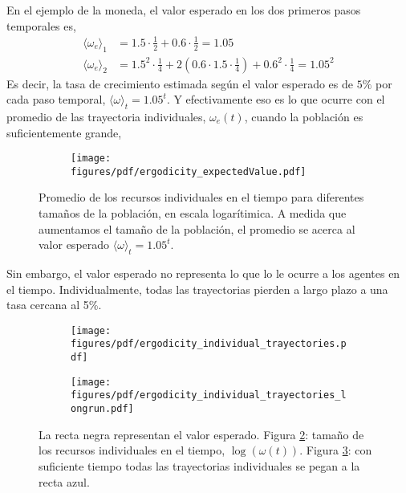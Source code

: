 \documentclass[a4paper,10pt]{article}
\begin{document}
En el ejemplo de la moneda, el valor esperado en los dos primeros pasos temporales es, 
%
\begin{equation}
\begin{split}
\langle \omega_e \rangle_1 & = 1.5 \cdot \frac{1}{2} + 0.6 \cdot  \frac{1}{2} = 1.05 \\ 
\langle \omega_e \rangle_2 &=  1.5^2 \cdot \frac{1}{4} + 2 (0.6 \cdot 1.5 \cdot \frac{1}{4} ) + 0.6^2 \cdot \frac{1}{4}= 1.05^2
\end{split}
\end{equation}
%
Es decir, la tasa de crecimiento estimada según el valor esperado es de $5\%$ por cada paso temporal, $\langle \omega \rangle_t = 1.05^t$.
Y efectivamente eso es lo que ocurre con el promedio de las trayectoria individuales, $\omega_e(t)$, cuando la población es suficientemente grande,
%
\begin{figure}[H]
    \centering
    \begin{subfigure}[b]{0.45\textwidth}
    \texttt{[image: figures/pdf/ergodicity\_expectedValue.pdf]}
    \end{subfigure}
    \caption{
    Promedio de los recursos individuales en el tiempo para diferentes tamaños de la población, en escala logarítimica.
    A medida que aumentamos el tamaño de la población, el promedio se acerca al valor esperado $\langle \omega \rangle_t = 1.05^t$.
    }
    \label{fig:cpr_individual}
\end{figure}
%
Sin embargo, el valor esperado no representa lo que lo le ocurre a los agentes en el tiempo. 
Individualmente, todas las trayectorias pierden a largo plazo a una tasa cercana al 5\%.
%
\begin{figure}[H]
    \centering
    \begin{subfigure}[b]{0.45\textwidth}
    \texttt{[image: figures/pdf/ergodicity\_individual\_trayectories.pdf]}
    \caption{}
    \label{fig:ergodicity_individual_trayectories}
    \end{subfigure}
    \begin{subfigure}[b]{0.45\textwidth}
    \texttt{[image: figures/pdf/ergodicity\_individual\_trayectories\_longrun.pdf]}
    \caption{}
    \label{fig:ergodicity_individual_trayectories_longrun}
    \end{subfigure}
    \caption{
    La recta negra representan el valor esperado.
    Figura \ref{fig:ergodicity_individual_trayectories}: tamaño de los recursos individuales en el tiempo, $ \log(\omega(t))$.
    Figura \ref{fig:ergodicity_individual_trayectories_longrun}: con suficiente tiempo todas las trayectorias individuales se pegan a la recta azul. 
    }
    \label{fig:cpr_individual}
\end{figure}
\end{document}
